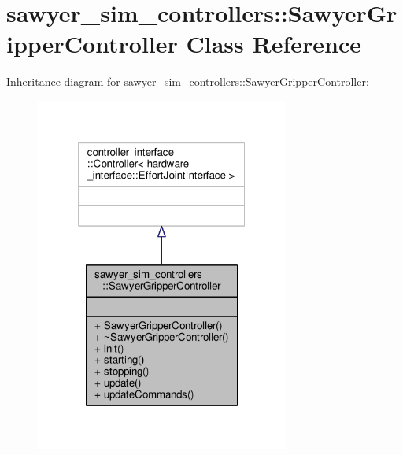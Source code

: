 \hypertarget{classsawyer__sim__controllers_1_1_sawyer_gripper_controller}{\section{sawyer\-\_\-sim\-\_\-controllers\-:\-:Sawyer\-Gripper\-Controller Class Reference}
\label{classsawyer__sim__controllers_1_1_sawyer_gripper_controller}
}


Inheritance diagram for sawyer\-\_\-sim\-\_\-controllers\-:\-:Sawyer\-Gripper\-Controller\-:\nopagebreak
\begin{figure}[H]
\begin{center}
\leavevmode
\includegraphics[width=236pt]{classsawyer__sim__controllers_1_1_sawyer_gripper_controller__inherit__graph}
\end{center}
\end{figure}


